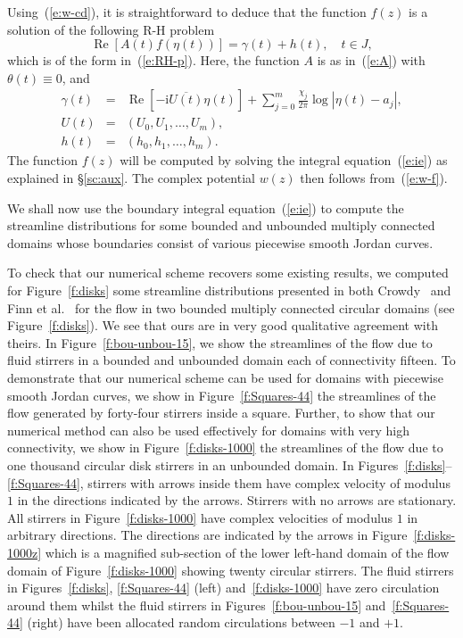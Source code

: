 \documentclass[11pt,a4paper]{article}
\renewcommand{\Re}{\mathop{\mathrm{Re}}}
\renewcommand{\i}{\mathrm{i}}
\renewcommand{\Re}{\mathop{\mathrm{Re}}}
\renewcommand{\i}{\mathrm{i}}
\begin{document}
Using~(\ref{e:w-cd}), it is straightforward to deduce that the function $f(z)$ is a solution of the following R-H problem  
\begin{equation}\label{e:f-rhp}
\Re[A(t)f(\eta(t))] =\gamma(t)+h(t), \quad t\in J,
\end{equation}
which is of the form in~(\ref{e:RH-p}). Here, the function $A$ is as in~(\ref{e:A}) with $\theta(t)\equiv0$, and
\begin{eqnarray}
\label{e:gam-rhp}
\gamma(t)&=&\Re[-\i\overline{U(t)}\eta(t)]+\sum_{j=0}^m \frac{\chi_j}{2\pi}\log|\eta(t)-a_j|, \\
\label{e:U-rhp}
U(t)&=& (U_0,U_1,\ldots,U_m), \\
\label{e:h-rhp}
h(t)&=& (h_0,h_1,\ldots,h_m).
\end{eqnarray}
The function $f(z)$ will be computed by solving the integral equation~(\ref{e:ie}) as explained in \S\ref{sc:aux}. The complex potential $w(z)$ then follows from~(\ref{e:w-f}).

We shall now use the boundary integral equation~(\ref{e:ie}) to compute the streamline distributions for some bounded and unbounded multiply connected domains whose boundaries consist of various piecewise smooth Jordan curves. 


To check that our numerical scheme recovers some existing results, we computed for Figure~\ref{f:disks} some streamline distributions presented in both Crowdy~\cite{cro-str} and Finn et al.~\cite{fin} for the flow in two bounded multiply connected circular domains (see Figure~\ref{f:disks}). 
We see that ours are in very good qualitative agreement with theirs. 
In Figure~\ref{f:bou-unbou-15}, we show the streamlines of the flow due to fluid stirrers in a bounded and unbounded domain each of connectivity fifteen. 
To demonstrate that our numerical scheme can be used for domains with piecewise smooth Jordan curves, we show in Figure~\ref{f:Squares-44} the streamlines of the flow generated by forty-four stirrers inside a square. Further, to show that our numerical method can also be used effectively for domains with very high connectivity, we show in Figure~\ref{f:disks-1000} the streamlines of the flow due to one thousand circular disk stirrers in an unbounded domain. 
In Figures~\ref{f:disks}--\ref{f:Squares-44}, stirrers with arrows inside them have complex velocity of modulus $1$ in the directions indicated by the arrows. Stirrers with no arrows are stationary.
All stirrers in Figure~\ref{f:disks-1000} have complex velocities of modulus $1$ in arbitrary directions. The directions are indicated by the arrows in Figure~\ref{f:disks-1000z} which is a magnified sub-section of the lower left-hand domain of the flow domain of Figure~\ref{f:disks-1000} showing twenty circular stirrers. 
The fluid stirrers in Figures~\ref{f:disks}, \ref{f:Squares-44} (left) and~\ref{f:disks-1000} have zero circulation around them whilst the fluid stirrers in Figures~\ref{f:bou-unbou-15} and~\ref{f:Squares-44} (right) have been allocated random circulations between $-1$ and $+1$.
\end{document}
